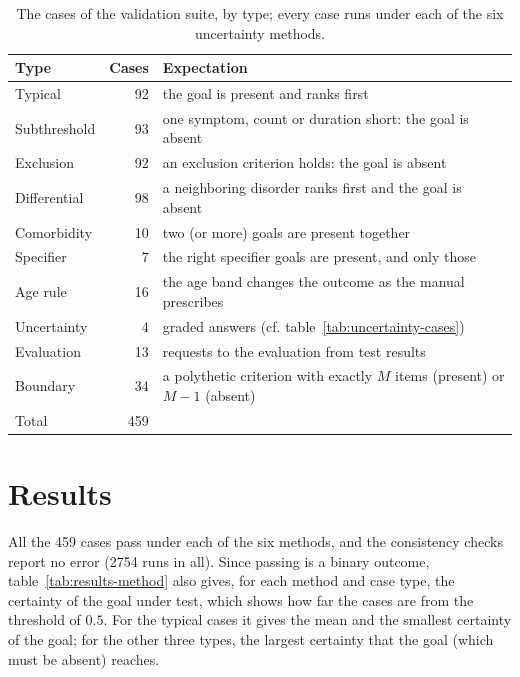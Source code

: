 \begin{table}[ht]
\centering
\caption{The cases of the validation suite, by type; every case runs under each
of the six uncertainty methods.}
\label{tab:case-types}
\small
\begin{tabular}{@{}lrp{9.4cm}@{}}
\toprule
\textbf{Type} & \textbf{Cases} & \textbf{Expectation} \\
\midrule
Typical & 92 & the goal is present and ranks first \\
Subthreshold & 93 & one symptom, count or duration short: the goal is absent \\
Exclusion & 92 & an exclusion criterion holds: the goal is absent \\
Differential & 98 & a neighboring disorder ranks first and the goal is absent \\
Comorbidity & 10 & two (or more) goals are present together \\
Specifier & 7 & the right specifier goals are present, and only those \\
Age rule & 16 & the age band changes the outcome as the manual prescribes \\
Uncertainty & 4 & graded answers (cf. table~\ref{tab:uncertainty-cases}) \\
Evaluation & 13 & requests to the evaluation from test results \\
Boundary & 34 & a polythetic criterion with exactly $M$ items (present) or $M-1$ (absent) \\
\midrule
Total & 459 & \\
\bottomrule
\end{tabular}
\end{table}

\section{Results}
\label{sec:val-results}

All the 459 cases pass under each of the six methods, and the consistency checks
report no error (2754 runs in all). Since passing is a binary outcome, table~\ref{tab:results-method} also
gives, for each method and case type, the certainty of the goal under test,
which shows how far the cases are from the threshold of $0.5$. For the typical
cases it gives the mean and the smallest certainty of the goal; for the other
three types, the largest certainty that the goal (which must be absent) reaches.

